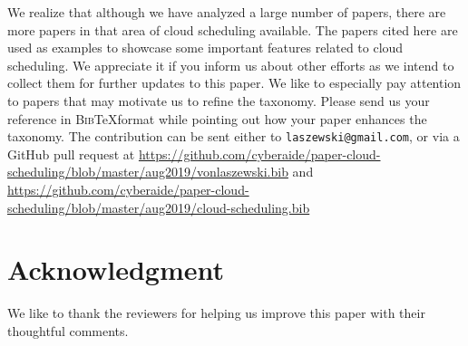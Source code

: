 \documentclass[final,5p,times,twocolumn]{elsarticle}
\begin{document}
We realize that although we have analyzed a large number of papers,
there are more papers in that area of cloud scheduling available. The
papers cited here are used as examples to showcase some important
features related to cloud scheduling. We appreciate it if you inform
us about other efforts as we intend to collect them for further
updates to this paper. We like to especially pay attention to papers
that may motivate us to refine the taxonomy. Please send us your
reference in \textsc{Bib}\TeX format while pointing out how your paper
enhances the taxonomy. The contribution can be sent either to
\verb|laszewski@gmail.com|, or via a GitHub pull request at
\url{https://github.com/cyberaide/paper-cloud-scheduling/blob/master/aug2019/vonlaszewski.bib}
and \url{https://github.com/cyberaide/paper-cloud-scheduling/blob/master/aug2019/cloud-scheduling.bib}

\section*{Acknowledgment}

We like to thank the reviewers for helping us improve this paper
with their thoughtful comments.

%




















\clearpage

\appendix


\end{document}
